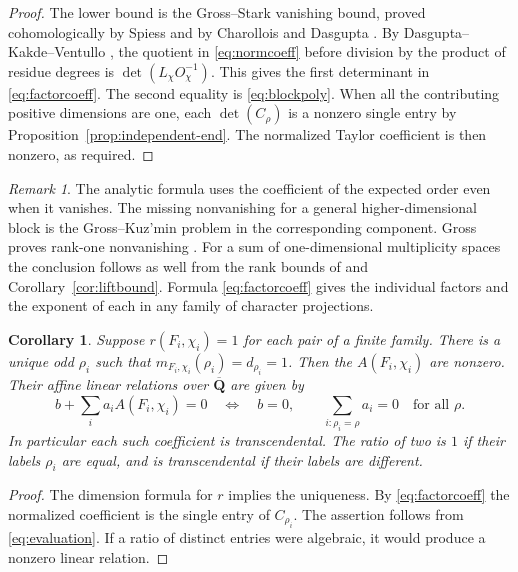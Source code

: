 \documentclass[11pt]{amsart}
\numberwithin{equation}{section}
\newtheorem{corollary}[theorem]{Corollary}
\theoremstyle{definition}
\theoremstyle{remark}
\newtheorem{remark}[theorem]{Remark}
\newcommand{\Qbar}{\overline{\mathbf Q}}
\begin{document}
\begin{proof}
The lower bound is the Gross--Stark vanishing bound, proved
cohomologically by Spiess and by Charollois and Dasgupta
\cite{Spiess,CD}. By Dasgupta--Kakde--Ventullo
\cite[Th.~1 and eq.~(8)]{DKV}, the quotient in
\eqref{eq:normcoeff} before division by the product of
residue degrees is $\det(L_\chi O_\chi^{-1})$.
This gives the first determinant in \eqref{eq:factorcoeff}.
The second equality is \eqref{eq:blockpoly}. When all the
contributing positive dimensions are one, each
$\det(C_\rho)$ is a nonzero single entry by
Proposition~\ref{prop:independent-end}. The normalized
Taylor coefficient is then nonzero, as required.
\end{proof}

\begin{remark}
The analytic formula uses the coefficient of the expected
order even when it vanishes. The missing nonvanishing
for a general higher-dimensional block is the
Gross--Kuz'min problem in the corresponding component.
Gross proves rank-one nonvanishing \cite[Prop.~2.13]{Gross}.
For a sum of one-dimensional multiplicity spaces the conclusion
follows as well from the rank bounds of
\cite[Thms.~4.3, 4.6]{Maksoud} and Corollary~\ref{cor:liftbound}. Formula
\eqref{eq:factorcoeff} gives the individual factors and
the exponent of each in any family of character projections.
\end{remark}

\begin{corollary}\label{cor:rankone}
Suppose $r(F_i,\chi_i)=1$ for each pair of a finite family.
There is a unique odd $\rho_i$ such that
$m_{F_i,\chi_i}(\rho_i)=d_{\rho_i}=1$. Then the
$A(F_i,\chi_i)$ are nonzero. Their affine linear relations
over $\Qbar$ are given by
\begin{equation}\label{eq:rankone-affine}
 b+\sum_i a_i A(F_i,\chi_i)=0
 \quad\Longleftrightarrow\quad
 b=0,\qquad \sum_{i:\rho_i=\rho}a_i=0\quad\text{for all }\rho .
\end{equation}
In particular each such coefficient is transcendental.
The ratio of two is $1$ if their labels $\rho_i$ are equal,
and is transcendental if their labels are different.
\end{corollary}

\begin{proof}
The dimension formula for $r$ implies the uniqueness.
By \eqref{eq:factorcoeff} the normalized coefficient is
the single entry of $C_{\rho_i}$. The assertion follows
from \eqref{eq:evaluation}. If a ratio of distinct entries
were algebraic, it would produce a nonzero linear relation.
\end{proof}
\end{document}
